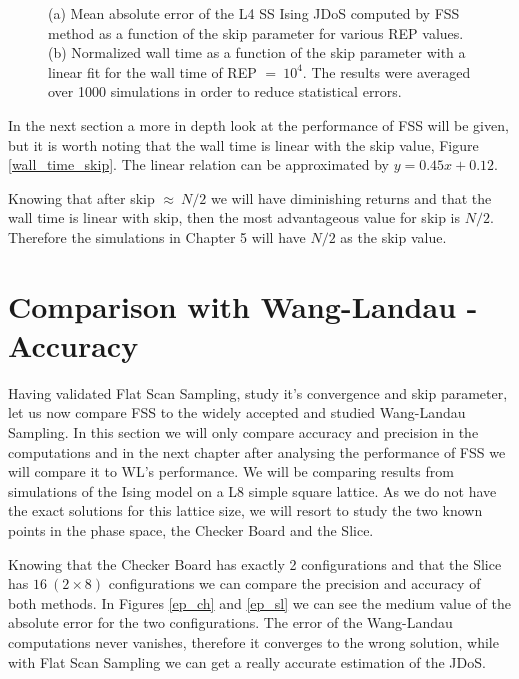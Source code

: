 \begin{figure}[h]
	\centering
	\caption{(a) Mean absolute error of the L4 SS Ising JDoS computed by FSS method as a function of the skip parameter for various REP values. (b) Normalized wall time as a function of the skip parameter with a linear fit for the wall time of REP $=\ 10^4$. The results were averaged over 1000 simulations in order to reduce statistical errors.}
\end{figure}

	In the next section a more in depth look at the performance of FSS will be given, but it is worth noting that the wall time is linear with the skip value, Figure \ref{wall_time_skip}. The linear relation can be approximated by $y=0.45x + 0.12$. 

	Knowing that after skip $\approx\ N/2$ we will have diminishing returns and that the wall time is linear with skip, then the most advantageous value for skip is $N/2$. Therefore the simulations in Chapter 5 will have $N/2$ as the skip value.

\section{Comparison with Wang-Landau - Accuracy}

	Having validated Flat Scan Sampling, study it's convergence and skip parameter, let us now compare FSS to the widely accepted and studied Wang-Landau Sampling. In this section we will only compare accuracy and precision in the computations and in the next chapter after analysing the performance of FSS we will compare it to WL's performance. 
	We will be comparing results from simulations of the Ising model on a L8 simple square lattice. As we do not have the exact solutions for this lattice size, we will resort to study the two known points in the phase space, the Checker Board and the Slice. 
	
	Knowing that the Checker Board has exactly 2 configurations and that the Slice has $16\ (2 \times 8)$ configurations we can compare the precision and accuracy of both methods. In Figures \ref{ep_ch} and \ref{ep_sl} we can see the medium value of the absolute error for the two configurations. The error of the Wang-Landau computations never vanishes, therefore it converges to the wrong solution, while with Flat Scan Sampling we can get a really accurate estimation of the JDoS. 
	
